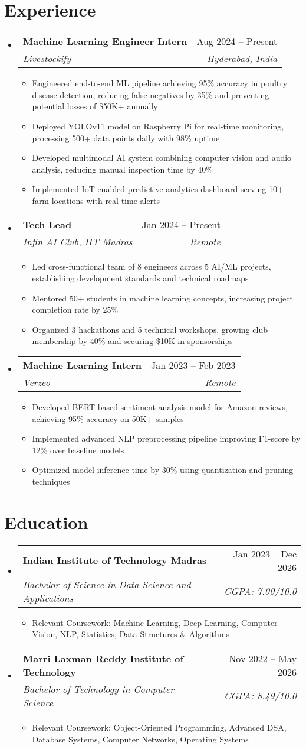 \documentclass[letterpaper,10.8pt]{article}
\makeatletter
\newcommand{\resumeItem}[1]{
  \item\small{#1}
}
\newcommand{\resumeSubheading}[4]{
  \item
    \begin{tabular*}{0.97\textwidth}[t]{l@{\extracolsep{\fill}}r}
      \textbf{#1} & #2 \\
      \textit{\small#3} & \textit{\small #4} \\
    \end{tabular*}\vspace{-3pt}
}
\newcommand{\resumeSubHeadingListStart}{\begin{itemize}[leftmargin=0.15in, label={}, itemsep=2pt]}
\newcommand{\resumeSubHeadingListEnd}{\end{itemize}\vspace{0pt}}
\newcommand{\resumeItemListStart}{\begin{itemize}[leftmargin=*,itemsep=2pt,parsep=0pt,topsep=1pt]}
\newcommand{\resumeItemListEnd}{\end{itemize}\vspace{0pt}}
\makeatother
\begin{document}
\section{Experience}
  \resumeSubHeadingListStart
    \resumeSubheading
      {Machine Learning Engineer Intern}{Aug 2024 -- Present}
      {Livestockify}{Hyderabad, India}
      \resumeItemListStart
        \resumeItem{Engineered end-to-end ML pipeline achieving 95\% accuracy in poultry disease detection, reducing false negatives by 35\% and preventing potential losses of \$50K+ annually}
        \resumeItem{Deployed YOLOv11 model on Raspberry Pi for real-time monitoring, processing 500+ data points daily with 98\% uptime}
        \resumeItem{Developed multimodal AI system combining computer vision and audio analysis, reducing manual inspection time by 40\%}
        \resumeItem{Implemented IoT-enabled predictive analytics dashboard serving 10+ farm locations with real-time alerts}
      \resumeItemListEnd
    \resumeSubheading
      {Tech Lead}{Jan 2024 -- Present}
      {Infin AI Club, IIT Madras}{Remote}
      \resumeItemListStart
          \resumeItem{Led cross-functional team of 8 engineers across 5 AI/ML projects, establishing development standards and technical roadmaps}
          \resumeItem{Mentored 50+ students in machine learning concepts, increasing project completion rate by 25\%}
          \resumeItem{Organized 3 hackathons and 5 technical workshops, growing club membership by 40\% and securing \$10K in sponsorships}
      \resumeItemListEnd
    \resumeSubheading
      {Machine Learning Intern}{Jan 2023 -- Feb 2023}
      {Verzeo}{Remote}
      \resumeItemListStart
          \resumeItem{Developed BERT-based sentiment analysis model for Amazon reviews, achieving 95\% accuracy on 50K+ samples}
          \resumeItem{Implemented advanced NLP preprocessing pipeline improving F1-score by 12\% over baseline models}
          \resumeItem{Optimized model inference time by 30\% using quantization and pruning techniques}
      \resumeItemListEnd
  \resumeSubHeadingListEnd

\section{Education}
  \resumeSubHeadingListStart
    \resumeSubheading
      {Indian Institute of Technology Madras}{Jan 2023 -- Dec 2026}
      {Bachelor of Science in Data Science and Applications}{CGPA: 7.00/10.0}
      \resumeItemListStart
        \resumeItem{Relevant Coursework: Machine Learning, Deep Learning, Computer Vision, NLP, Statistics, Data Structures \& Algorithms}
      \resumeItemListEnd
    \resumeSubheading
      {Marri Laxman Reddy Institute of Technology}{Nov 2022 -- May 2026}
      {Bachelor of Technology in Computer Science}{CGPA: 8.49/10.0}
      \resumeItemListStart
        \resumeItem{Relevant Coursework: Object-Oriented Programming, Advanced DSA, Database Systems, Computer Networks, Operating Systems}
      \resumeItemListEnd
  \resumeSubHeadingListEnd
\end{document}
